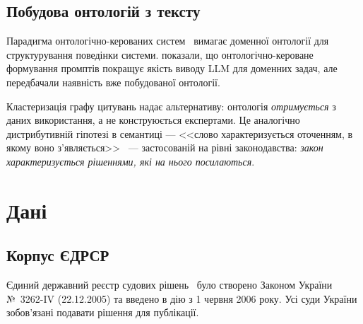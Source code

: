 \documentclass[11pt]{article}
\begin{document}
\subsection{Побудова онтологій з тексту}

Парадигма онтологічно-керованих систем~\citep{palagin2006architecture} вимагає доменної онтології для структурування поведінки системи.
\citet{palagin2023ontochatgpt} показали, що онтологічно-кероване формування промптів покращує якість виводу LLM для доменних задач, але передбачали наявність вже побудованої онтології.

Кластеризація графу цитувань надає альтернативу: онтологія \emph{отримується} з даних використання, а не конструюється експертами.
Це аналогічно дистрибутивній гіпотезі в семантиці --- <<слово характеризується оточенням, в якому воно з'являється>>~\citep{palagin2020distributional} --- застосованій на рівні законодавства: \emph{закон характеризується рішеннями, які на нього посилаються}.


\section{Дані}
\label{sec:data}

\subsection{Корпус ЄДРСР}

Єдиний державний реєстр судових рішень~\citep{edrsr2024} було створено Законом України №~3262-IV (22.12.2005) та введено в дію з 1 червня 2006 року.
Усі суди України зобов'язані подавати рішення для публікації.
\end{document}
